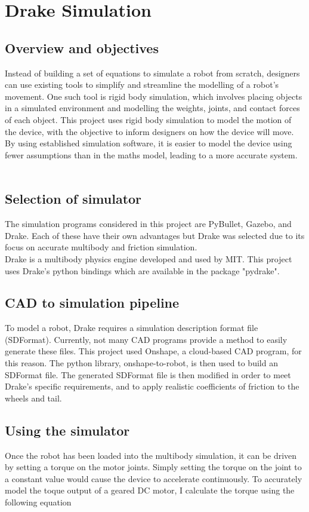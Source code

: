\chapter{Drake Simulation}

\section{Overview and objectives}

Instead of building a set of equations to simulate a robot from scratch, designers can use existing tools to simplify and streamline the modelling of a robot's movement. One such tool is rigid body simulation, which involves placing objects in a simulated environment and modelling the weights, joints, and contact forces of each object. This project uses rigid body simulation to model the motion of the device, with the objective to inform designers on how the device will move. By using established simulation software, it is easier to model the device using fewer assumptions than in the maths model, leading to a more accurate system.\\
\\
\section{Selection of simulator}
The simulation programs considered in this project are PyBullet, Gazebo, and Drake. Each of these have their own advantages but Drake was selected due to its focus on accurate multibody and friction simulation.
\\
Drake is a multibody physics engine developed and used by MIT. This project uses Drake's python bindings which are available in the package "pydrake".\\
\section{CAD to simulation pipeline}
To model a robot, Drake requires a simulation description format file (SDFormat). Currently, not many CAD programs provide a method to easily generate these files. This project used Onshape, a cloud-based CAD program, for this reason. The python library, onshape-to-robot, is then used to build an SDFormat file. The generated SDFormat file is then modified in order to meet Drake's specific requirements, and to apply realistic coefficients of friction to the wheels and tail.\\

\section{Using the simulator}
Once the robot has been loaded into the multibody simulation, it can be driven by setting a torque on the motor joints. Simply setting the torque on the joint to a constant value would cause the device to accelerate continuously. To accurately model the toque output of a geared DC motor, I calculate the torque using the following equation\\

